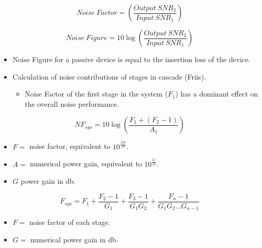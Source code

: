 \begin{equation}
Noise \:Factor = \left(\dfrac{Output\:SNR_2}{Input\:SNR_1}\right)
\end{equation}

\begin{equation}
Noise \:Figure = 10\log\left(\dfrac{Output\:SNR_2}{Input\:SNR_1}\right)
\end{equation}

\begin{itemize}
	\item Noise Figure for a passive device is equal to the insertion loss of
	the device.
	\item Calculation of noise contributions of stages in cascade (Friis).
	\begin{itemize}
		\item Noise Factor of the first stage in the system ($F_1$) has a dominant effect on the overall noise performance.
	\end{itemize}
\end{itemize}

\begin{equation}
NF_{sys} = 10\log\left(\dfrac{F_1+(F_2-1)}{A_1}\right)
\end{equation}

\begin{itemize}
	\item $F =$ noise factor, equivalent to $10^{\frac{NF}{10}}$.
	\item $A=$ numerical power gain, equivalent to $10^{\frac{G}{10}}$.
	\item $G$ power gain in \si{\decibel}.
\end{itemize}

\begin{equation}
F_{sys} = F_1+\dfrac{F_2-1}{G_1}+\dfrac{F_3-1}{G_1G_2}+\dfrac{F_n-1}{G_1G_2...G_{n-1}}
\end{equation}

\begin{itemize}
	\item $F =$ noise factor of each stage.
	\item $G=$ numerical power gain in \si{\decibel}.
\end{itemize}